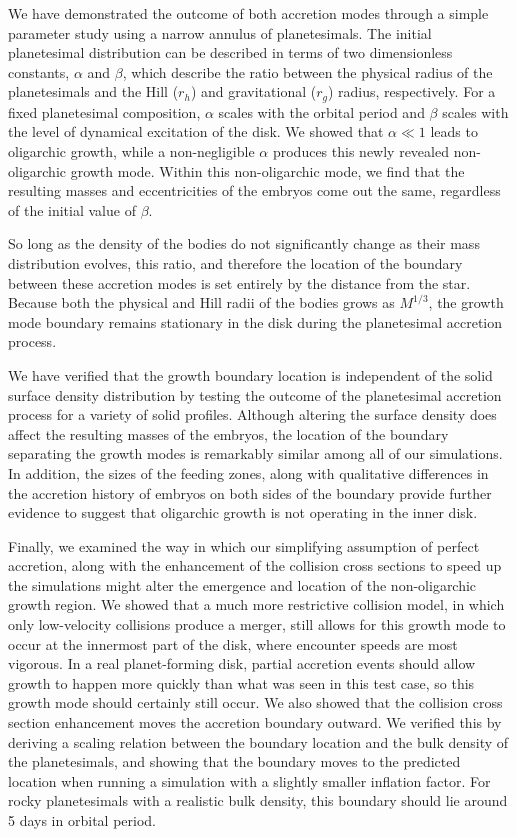 \documentclass[twocolumn,linenumbers]{aastex63}
\begin{document}
We have demonstrated the outcome of both accretion modes through a
simple parameter study using a narrow annulus of planetesimals. The initial planetesimal distribution can be described in terms of two dimensionless 
constants, $\alpha$ and $\beta$, which describe the ratio between the physical radius of the planetesimals and the Hill ($r_{h}$) 
and gravitational ($r_{g}$) radius, respectively. For a fixed planetesimal composition, $\alpha$ scales with the orbital period and 
$\beta$ scales with the level of dynamical excitation of the disk. We showed that $\alpha \ll 1$ leads to oligarchic growth, while a 
non-negligible $\alpha$ produces this newly revealed non-oligarchic growth mode. Within this non-oligarchic mode, we find that 
the resulting masses and eccentricities of the embryos come out the same, regardless of the initial value of $\beta$.

So long as the density of the bodies do not significantly change as
their mass distribution evolves, this ratio, and therefore the
location of the boundary between these accretion modes is set entirely by the distance
from the star. Because both the physical and Hill radii of the bodies
grows as $M^{1/3}$, the growth mode boundary remains stationary
 in the disk during the planetesimal accretion process.
 
We have verified that the growth boundary location is independent of the
solid surface density distribution by testing the outcome of the planetesimal
accretion process for a variety of solid
profiles. Although altering the surface density does affect the
resulting masses of the embryos, the location of the boundary
separating the growth modes is remarkably similar among all of our simulations.
In addition, the sizes of the feeding zones, along with qualitative differences in the
accretion history of embryos on both sides of the boundary provide further evidence to
suggest that oligarchic growth is not operating in the inner disk.

Finally, we examined the way in which our simplifying assumption of perfect accretion, along with the enhancement of the 
collision cross sections to speed up the simulations might alter the emergence and location of the non-oligarchic growth region. 
We showed that a much more restrictive collision model, in which only low-velocity collisions produce a merger, still allows for 
this growth mode to occur at the innermost part of the disk, where encounter speeds are most vigorous. In a real planet-forming 
disk, partial accretion events should allow growth to happen more quickly than what was seen in this test case, so this growth 
mode should certainly still occur. We also showed that the collision cross section enhancement moves the accretion boundary 
outward. We verified this by deriving a scaling relation between the boundary location and the bulk density of the planetesimals, 
and showing that the boundary moves to the predicted location when running a simulation with a slightly smaller inflation factor. 
For rocky planetesimals with a realistic bulk density, this boundary should lie around 5 days in orbital period.
\end{document}
